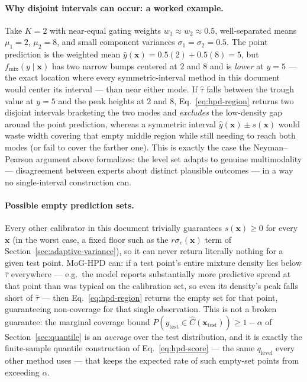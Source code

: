 \documentclass[11pt]{article}
\begin{document}
\paragraph{Why disjoint intervals can occur: a worked example.} Take $K=2$ with near-equal
gating weights $w_1\approx w_2\approx 0.5$, well-separated means $\mu_1=2$, $\mu_2=8$, and small
component variances $\sigma_1=\sigma_2=0.5$. The point prediction is the weighted mean
$\hat y(\bm x)=0.5(2)+0.5(8)=5$, but $f_{\mathrm{mix}}(y\mid\bm x)$ has two narrow bumps centered
at $2$ and $8$ and is \emph{lower} at $y=5$ — the exact location where every symmetric-interval
method in this document would center its interval — than near either mode. If $\hat\tau$ falls
between the trough value at $y=5$ and the peak heights at $2$ and $8$, Eq.~\eqref{eq:hpd-region}
returns two disjoint intervals bracketing the two modes and \emph{excludes} the low-density gap
around the point prediction, whereas a symmetric interval $\hat y(\bm x)\pm s(\bm x)$ would waste
width covering that empty middle region while still needing to reach both modes (or fail to
cover the farther one). This is exactly the case the Neyman--Pearson argument above formalizes:
the level set adapts to genuine multimodality — disagreement between experts about distinct
plausible outcomes — in a way no single-interval construction can.

\paragraph{Possible empty prediction sets.} Every other calibrator in this document trivially
guarantees $s(\bm x)\ge 0$ for every $\bm x$ (in the worst case, a fixed floor such as the
$r\sigma_e(\bm x)$ term of Section~\ref{sec:adaptive-variance}), so it can never return literally
nothing for a given test
point. MoG-HPD can: if a test point's entire mixture density lies below $\hat\tau$ everywhere —
e.g.\ the model reports substantially more predictive spread at that point than was typical on
the calibration set, so even its density's peak falls short of $\hat\tau$ — then
Eq.~\eqref{eq:hpd-region} returns the empty set for that point, guaranteeing non-coverage for
that single observation. This is not a broken guarantee: the marginal coverage bound
$P(y_{\mathrm{test}}\in\hat C(\bm x_{\mathrm{test}}))\ge 1-\alpha$ of Section~\ref{sec:quantile}
is an \emph{average} over the test distribution, and it is exactly the finite-sample quantile
construction of Eq.~\eqref{eq:hpd-score} — the same $q_{\mathrm{level}}$ every other method uses
— that keeps the expected rate of such empty-set points from exceeding $\alpha$.
\end{document}
